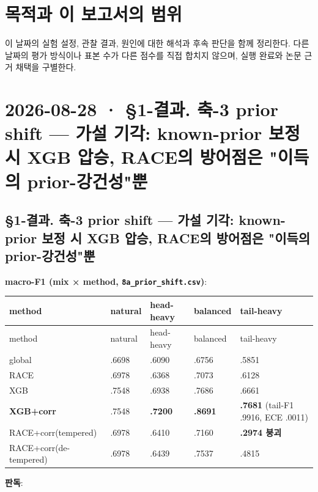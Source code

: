 




\section*{목적과 이 보고서의 범위}

이 날짜의 실험 설정, 관찰 결과, 원인에 대한 해석과 후속 판단을 함께 정리한다. 다른 날짜의 평가 방식이나 표본 수가 다른 점수를 직접 합치지 않으며, 실행 완료와 논문 근거 채택을 구별한다.


\section{2026-08-28 · §1-결과. 축-3 prior shift — 가설 기각: known-prior 보정 시 XGB 압승, RACE의 방어점은 "이득의 prior-강건성"뿐}
\label{report:20260828_0828}
\subsection{§1-결과. 축-3 prior shift — 가설 기각: known-prior 보정 시 XGB 압승, RACE의 방어점은 "이득의 prior-강건성"뿐}
\textbf{macro-F1 (mix × method, \texttt{8a\_\allowbreak{}\allowbreak{}prior\allowbreak{}\_\allowbreak{}\allowbreak{}shift.\allowbreak{}c\allowbreak{}sv})}:

\begingroup
\footnotesize
\begin{longtable}{>{\raggedright\arraybackslash}p{}>{\raggedleft\arraybackslash}p{}>{\raggedleft\arraybackslash}p{}>{\raggedleft\arraybackslash}p{}>{\raggedleft\arraybackslash}p{}}
\toprule
method & natural & head-heavy & balanced & tail-heavy \\ \midrule
\endfirsthead
method & natural & head-heavy & balanced & tail-heavy \\ \midrule
\endhead
{}global & .6698 & .6090 & .6756 & .5851 \\
{}RACE & .6978 & .6368 & .7073 & .6128 \\
{}XGB & .7548 & .6938 & .7686 & .6661 \\
{}\textbf{XGB+\allowbreak{}corr} & .7548 & \textbf{.7200} & \textbf{.8691} & \textbf{.7681} (tail-F1 .9916, ECE .0011) \\
{}RACE+\allowbreak{}corr(tempered) & .6978 & .6410 & .7160 & \textbf{.2974 붕괴} \\
{}RACE+\allowbreak{}corr(de-tempered) & .6978 & .6439 & .7537 & .4815 \\
\bottomrule
\end{longtable}
\endgroup
\textbf{판독}:

